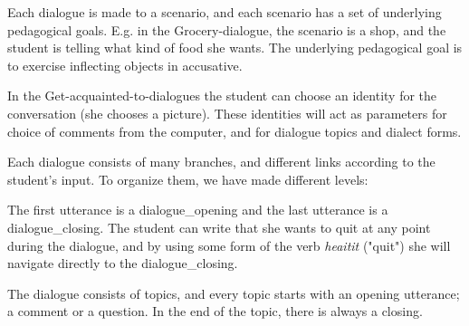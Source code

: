\documentclass[11pt]{article}
\begin{document}
Each dialogue is made to a scenario, and each scenario has a set of underlying pedagogical goals. E.g. in the Grocery-dialogue, the scenario is a shop, and the student is telling what kind of food she wants. The underlying pedagogical goal is to exercise inflecting objects in accusative.


In the Get-acquainted-to-dialogues the student can choose an identity for the conversation (she chooses a picture). These identities will act as parameters for choice of comments from the computer, and for dialogue topics and dialect forms.

%	

Each dialogue consists of many branches, and different links according to the student's input. To organize them, we have made different levels:

The first utterance is a dialogue\_opening and the last utterance is a dialogue\_closing. The student can write that she wants to quit at any point during the dialogue, and by using some form of the verb \textit{heaitit} ("quit") she will navigate directly to the dialogue\_closing.

The dialogue consists of topics, and every topic starts with an opening utterance; a comment or a question. In the end of the topic, there is always a closing.  
\end{document}
